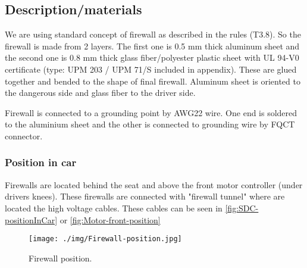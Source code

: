 \subsection{Description/materials}

We are using standard concept of firewall as described in the rules (T3.8). So the firewall is made from 2 layers. The first one is 0.5 mm thick aluminum sheet and the second one is 0.8 mm thick glass fiber/polyester plastic sheet with UL 94-V0 certificate (type: UPM 203 / UPM 71/S included in appendix). These are glued together and bended to the shape of final firewall. Aluminum sheet is oriented to the dangerous side and glass fiber to the driver side.

Firewall is connected to a grounding point by AWG22 wire. One end is soldered to the aluminium sheet and the other is connected to grounding wire by FQCT connector.

\subsubsection{Position in car}

Firewalls are located behind the seat and above the front motor controller (under drivers knees). These firewalls are connected with "firewall tunnel" where are located the high voltage cables. These cables can be seen in \ref{fig:SDC-positionInCar} or \ref{fig:Motor-front-position} 

\begin{figure}[H]
	\centering
	\texttt{[image: ./img/Firewall-position.jpg]}
	\caption{Firewall position.}
	\label{fig:Firewall-position}
\end{figure}